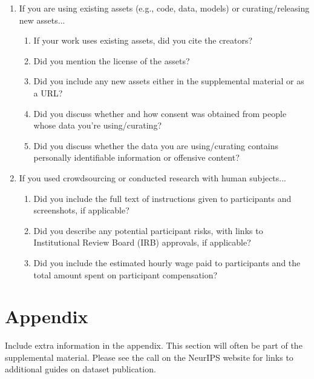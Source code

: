 \begin{enumerate}
\item If you are using existing assets (e.g., code, data, models) or curating/releasing new assets...
\begin{enumerate}
  \item If your work uses existing assets, did you cite the creators?
    \answerTODO{}
  \item Did you mention the license of the assets?
    \answerTODO{}
  \item Did you include any new assets either in the supplemental material or as a URL?
    \answerTODO{}
  \item Did you discuss whether and how consent was obtained from people whose data you're using/curating?
    \answerTODO{}
  \item Did you discuss whether the data you are using/curating contains personally identifiable information or offensive content?
    \answerTODO{}
\end{enumerate}

\item If you used crowdsourcing or conducted research with human subjects...
\begin{enumerate}
  \item Did you include the full text of instructions given to participants and screenshots, if applicable?
    \answerTODO{}
  \item Did you describe any potential participant risks, with links to Institutional Review Board (IRB) approvals, if applicable?
    \answerTODO{}
  \item Did you include the estimated hourly wage paid to participants and the total amount spent on participant compensation?
    \answerTODO{}
\end{enumerate}

\end{enumerate}


\appendix

\section{Appendix}

Include extra information in the appendix. This section will often be part of the supplemental material. Please see the call on the NeurIPS website for links to additional guides on dataset publication.

